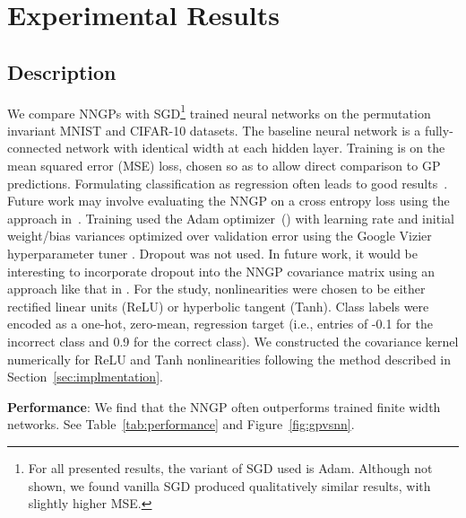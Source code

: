 \documentclass{article} %
\begin{document}
\section{Experimental Results}
\label{sec:Exp}

\subsection{Description}
\label{sec:description}

We compare NNGPs with SGD\footnote{For all presented results, the variant of SGD used is Adam. Although not shown, we found vanilla SGD produced qualitatively similar results, with slightly higher MSE.} trained neural networks on the permutation invariant MNIST and CIFAR-10 datasets. 
The baseline neural network is a fully-connected network with identical width at each hidden layer. 
Training is on the mean squared error (MSE) loss, chosen so as to allow direct comparison to GP predictions. 
Formulating classification as regression often leads to good results~\citep{rifkin2004}. 
Future work may involve evaluating the NNGP on a cross entropy loss using the approach in~\citep{williams1998classification, rasmussen2006gaussian}.
Training used the Adam optimizer~(\cite{kingma2014adam}) with learning rate and initial weight/bias variances optimized over validation error using the Google Vizier hyperparameter tuner \citep{golovin2017}. Dropout was not used. In future work, it would be interesting to incorporate dropout into the NNGP covariance matrix using an approach like that in \citep{schoenholz2016}. 
For the study, nonlinearities were chosen to be either rectified linear units (ReLU) or hyperbolic tangent (Tanh). 
Class labels were encoded as a one-hot, zero-mean, regression target (i.e., entries of -0.1 for the incorrect class and 0.9 for the correct class).
We constructed the covariance kernel numerically for ReLU and Tanh nonlinearities following the method described in Section~\ref{sec:implmentation}.


{\bf Performance}: We find that the NNGP often outperforms trained finite width networks. See Table~\ref{tab:performance} and Figure~\ref{fig:gpvsnn}. 
\end{document}
